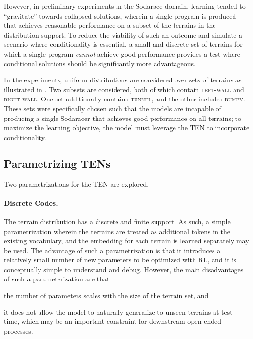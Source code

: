 \documentclass{article}
\begin{document}
However, in preliminary experiments in the Sodarace domain, learning tended to ``gravitate'' towards collapsed solutions, wherein a single program is produced that achieves reasonable performance on a subset of the terrains in the distribution support. To reduce the viability of such an outcome and simulate a scenario where conditionality is essential, a small and discrete set of terrains for which a single program \emph{cannot} achieve good performance provides a test where conditional solutions should be significantly more advantageous. 


In the experiments, uniform distributions are considered over sets of terrains as illustrated in . Two subsets are considered, both of which contain \textsc{left-wall} and \textsc{right-wall}. One set additionally contains \textsc{tunnel}, and the other includes \textsc{bumpy}. These sets were specifically chosen such that the models are incapable of producing a single Sodaracer that achieves good performance on all terrains; to maximize the learning objective, the model must leverage the TEN to incorporate conditionality. %



\subsection{Parametrizing TENs}

\label{sec:ten-parametrization}
Two parametrizations for the TEN are explored. 
\paragraph{Discrete Codes.}
The terrain distribution has a discrete and finite support. 
As such, a simple parametrization wherein the terrains are treated as additional tokens in the existing vocabulary, and the embedding for each terrain is learned separately may be used.
The advantage of such a parametrization is that it introduces a relatively small number of new parameters to be optimized 
with RL, and it is conceptually simple to understand and debug.
However, the main disadvantages of such a parameterization are that
\begin{inlinelist}
    \item the number of parameters scales with the size of the terrain set, and 
    \item it does not allow the model to naturally generalize to unseen terrains at test-time, which may be an important constraint for downstream open-ended processes.
\end{inlinelist}
\end{document}
